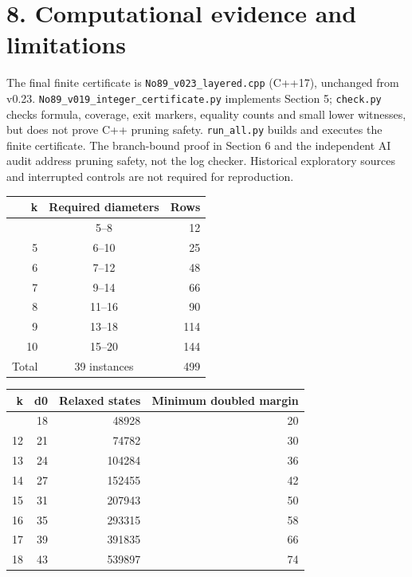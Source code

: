 \documentclass[
  11pt,
]{article}
\begin{document}
\section{8. Computational evidence and
limitations}\label{computational-evidence-and-limitations}

The final finite certificate is \texttt{No89\_v023\_layered.cpp}
(C++17), unchanged from v0.23.
\texttt{No89\_v019\_integer\_certificate.py} implements Section 5;
\texttt{check.py} checks formula, coverage, exit markers, equality
counts and small lower witnesses, but does not prove C++ pruning safety.
\texttt{run\_all.py} builds and executes the finite certificate. The
branch-bound proof in Section 6 and the independent AI audit address
pruning safety, not the log checker. Historical exploratory sources and
interrupted controls are not required for reproduction.

\begin{longtable}[]{@{}rcr@{}}
\toprule\noalign{}
k & Required diameters & Rows \\
\midrule\noalign{}
\endhead
\bottomrule\noalign{}
\endlastfoot
4 & 5--8 & 12 \\
5 & 6--10 & 25 \\
6 & 7--12 & 48 \\
7 & 9--14 & 66 \\
8 & 11--16 & 90 \\
9 & 13--18 & 114 \\
10 & 15--20 & 144 \\
Total & 39 instances & 499 \\
\end{longtable}

\begin{longtable}[]{@{}rrrr@{}}
\toprule\noalign{}
k & d0 & Relaxed states & Minimum doubled margin \\
\midrule\noalign{}
\endhead
\bottomrule\noalign{}
\endlastfoot
11 & 18 & 48928 & 20 \\
12 & 21 & 74782 & 30 \\
13 & 24 & 104284 & 36 \\
14 & 27 & 152455 & 42 \\
15 & 31 & 207943 & 50 \\
16 & 35 & 293315 & 58 \\
17 & 39 & 391835 & 66 \\
18 & 43 & 539897 & 74 \\
\end{longtable}
\end{document}
